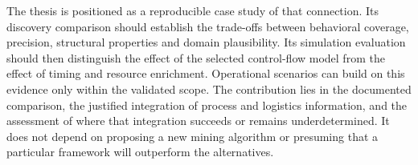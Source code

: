 The thesis is positioned as a reproducible case study of that connection. Its discovery comparison should establish the trade-offs between behavioral coverage, precision, structural properties and domain plausibility. Its simulation evaluation should then distinguish the effect of the selected control-flow model from the effect of timing and resource enrichment. Operational scenarios can build on this evidence only within the validated scope. The contribution lies in the documented comparison, the justified integration of process and logistics information, and the assessment of where that integration succeeds or remains underdetermined. It does not depend on proposing a new mining algorithm or presuming that a particular framework will outperform the alternatives.

